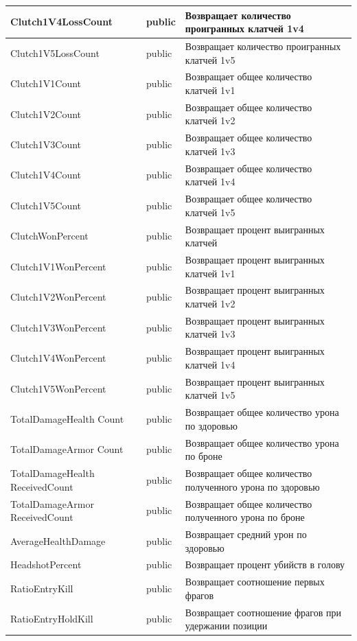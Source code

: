 \begin{xltabular}{\textwidth}{|X|X|X|}
	Clutch1V4LossCount & public & Возвращает количество проигранных клатчей 1v4 \\ \hline
	Clutch1V5LossCount & public & Возвращает количество проигранных клатчей 1v5 \\ \hline
	Clutch1V1Count & public & Возвращает общее количество клатчей 1v1 \\ \hline
	Clutch1V2Count & public & Возвращает общее количество клатчей 1v2 \\ \hline
	Clutch1V3Count & public & Возвращает общее количество клатчей 1v3 \\ \hline
	Clutch1V4Count & public & Возвращает общее количество клатчей 1v4 \\ \hline
	Clutch1V5Count & public & Возвращает общее количество клатчей 1v5 \\ \hline
	ClutchWonPercent & public & Возвращает процент выигранных клатчей \\ \hline
	Clutch1V1WonPercent & public & Возвращает процент выигранных клатчей 1v1 \\ \hline
	Clutch1V2WonPercent & public & Возвращает процент выигранных клатчей 1v2 \\ \hline
	Clutch1V3WonPercent & public & Возвращает процент выигранных клатчей 1v3 \\ \hline
	Clutch1V4WonPercent & public & Возвращает процент выигранных клатчей 1v4 \\ \hline
	Clutch1V5WonPercent & public & Возвращает процент выигранных клатчей 1v5 \\ \hline
	TotalDamageHealth
	Count & public & Возвращает общее количество урона по здоровью \\ \hline
	TotalDamageArmor
	Count & public & Возвращает общее количество урона по броне \\ \hline
	TotalDamageHealth
	ReceivedCount & public & Возвращает общее количество полученного урона по здоровью \\ \hline
	TotalDamageArmor
	ReceivedCount & public & Возвращает общее количество полученного урона по броне \\ \hline
	AverageHealthDamage & public & Возвращает средний урон по здоровью \\ \hline
	HeadshotPercent & public & Возвращает процент убийств в голову \\ \hline
	RatioEntryKill & public & Возвращает соотношение первых фрагов \\ \hline
	RatioEntryHoldKill & public & Возвращает соотношение фрагов при удержании позиции \\ \hline

\end{xltabular}

